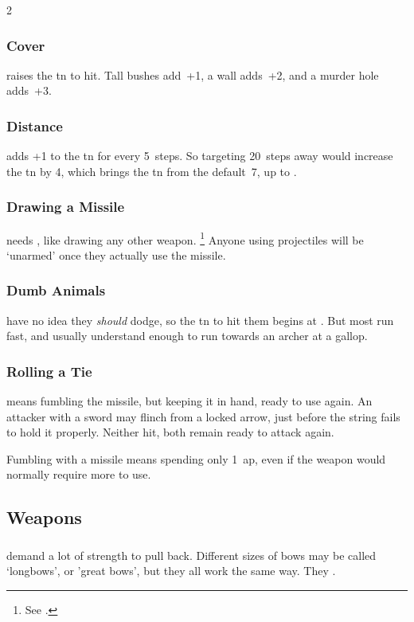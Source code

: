 \begin{multicols}{2}
\subsubsection{Cover}
raises the \gls{tn} to hit.
Tall bushes add~+1, a wall adds~+2, and a murder hole adds~+3.

\subsubsection{Distance}
adds +1 to the \gls{tn} for every 5~\glspl{step}.
So targeting  20~\glspl{step} away would increase the \gls{tn} by 4, which brings the \gls{tn} from the default~7, up to \tn[11].

\subsubsection{Drawing a Missile}
needs , like drawing any other weapon.%
\footnote{See  .}
Anyone using \glspl{projectile} will be `unarmed' once they actually use the missile.

\subsubsection{Dumb Animals}
\label{missilesForMonsters}
have no idea they \emph{should} dodge, so the \gls{tn} to hit them begins at \tn[7].
But most run fast, and usually understand enough to run towards an archer at a gallop.

\subsubsection{Rolling a Tie}
means fumbling the missile, but keeping it in hand, ready to use again.
An attacker with a sword may flinch from a locked arrow, just before the string fails to hold it properly.
Neither hit, both remain ready to attack again.

Fumbling with a missile means spending only 1~\gls{ap}, even if the weapon would normally require more to use.

\subsection{ Weapons}

\subsubsection{}
\label{longbow}
demand a lot of strength to pull back.
Different sizes of bows may be called `longbows', or 'great bows', but they all work the same way.
They .


\end{multicols}
